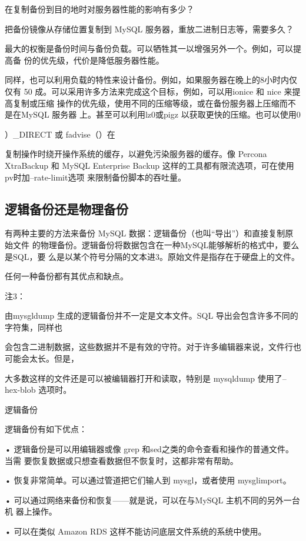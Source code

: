 在复制备份到目的地时对服务器性能的影响有多少？

把备份镜像从存储位置复制到 MySQL 服务器，重放二进制日志等，需要多久？

最大的权衡是备份时间与备份负载。可以牺牲其一以增强另外一个。例如，可以提高备
份的优先级，代价是降低服务器性能。

同样，也可以利用负载的特性来设计备份。例如，如果服务器在晚上的8小时内仅仅有
50%
成。可以采用许多方法来完成这个目标，例如，可以用ionice 和 nice 来提高复制或压缩
操作的优先级，使用不同的压缩等级，或在备份服务器上压缩而不是在MySQL 服务器
上。甚至可以利用lz0或pigz 以获取更快的压缩。也可以使用0

）\_DIRECT 或 fadvise（）在

复制操作时绕开操作系统的缓存，以避免污染服务器的缓存。像 Percona XtraBackup 和
MySQL Enterprise Backup 这样的工具都有限流选项，可在使用pv时加--rate-limit选项
来限制备份脚本的吞吐量。

\subsection{逻辑备份还是物理备份}
有两种主要的方法来备份 MySQL 数据：逻辑备份（也叫“导出”）和直接复制原始文件
的物理备份。逻辑备份将数据包含在一种MySQL能够解析的格式中，要么是SQL，要
么是以某个符号分隔的文本进3。原始文件是指存在于硬盘上的文件。

任何一种备份都有其优点和缺点。

注3：

由mysgldump 生成的逻辑备份并不一定是文本文件。SQL 导出会包含许多不同的字符集，同样也

会包含二进制数据，这些数据并不是有效的守符。对于许多编辑器来说，文件行也可能会太长。但是，

大多数这样的文件还是可以被编辑器打开和读取，特别是 mysqldump 使用了--hex-blob 选项时。

逻辑备份

逻辑备份有如下优点：

• 逻辑备份是可以用编辑器或像 grep 和sed之类的命令查看和操作的普通文件。当需
要恢复数据或只想查看数据但不恢复时，这都非常有帮助。

• 恢复非常简单。可以通过管道把它们输人到 mysgl，或者使用 mysglimport。

• 可以通过网络来备份和恢复——就是说，可以在与MySQL 主机不同的另外一台机
器上操作。

• 可以在类似 Amazon RDS 这样不能访问底层文件系统的系统中使用。


